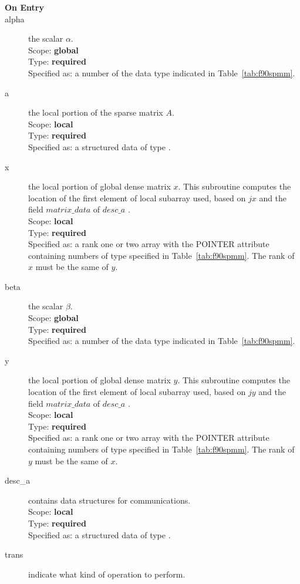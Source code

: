\begin{description}
\item[\bf On Entry]
\item[alpha] the scalar $\alpha$.\\
Scope: {\bf global} \\
Type: {\bf required}\\
Specified as: a number of the data type indicated in
Table~\ref{tab:f90spmm}. 
\item[a] the local portion of the sparse matrix
$A$. \\ 
Scope: {\bf local} \\
Type: {\bf required}\\
Specified as: a structured data of type \spdata.
\item[x] the local portion of global dense matrix
$x$. This subroutine computes the location of the first element of
local subarray used, based on $jx$ and the field $matrix\_data$ of $desc\_a$ . \\
Scope: {\bf local} \\
Type: {\bf required} \\
Specified as:  a rank one or two array with the POINTER attribute
containing numbers of type specified in
Table~\ref{tab:f90spmm}.  The rank of $x$ must be the same of $y$. 
\item[beta] the scalar $\beta$.\\
Scope: {\bf global} \\
Type: {\bf required} \\
Specified as: a number of the data type indicated in Table~\ref{tab:f90spmm}.
\item[y] the local portion of global dense matrix
$y$. This subroutine computes the location of the first element of
local subarray used, based on $jy$ and the field $matrix\_data$ of $desc\_a$ . \\
Scope: {\bf local} \\
Type: {\bf required} \\
Specified as:  a rank one or two array with the POINTER attribute
containing numbers of type specified in
Table~\ref{tab:f90spmm}. The rank of $y$ must be the same of $x$. 
\item[desc\_a] contains data structures for communications.\\
Scope: {\bf local} \\
Type: {\bf required}\\
Specified as: a structured data of type \descdata.
\item[trans] indicate what kind of operation to perform.

\end{description}
